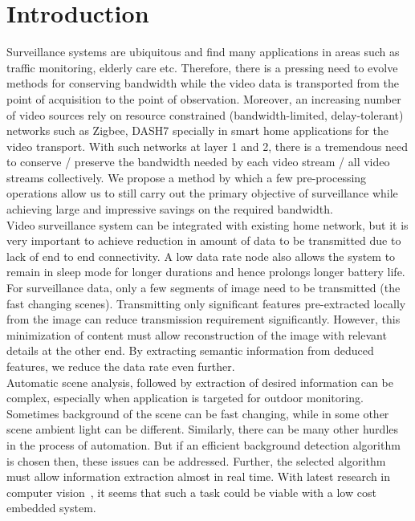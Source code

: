 \documentclass[a4paper, 12pt, twoside]{synopsis}  %
\begin{document}
\section{Introduction}
\indent Surveillance systems are ubiquitous and find many applications
in areas such as traffic monitoring, elderly care etc. Therefore, there
is a pressing need to evolve methods for conserving bandwidth while the
video data is transported from the point of acquisition to the point of
observation. Moreover, an increasing number of video sources rely on
resource constrained (bandwidth-limited, delay-tolerant) networks such
as Zigbee, DASH7 specially in smart home applications for the video
transport. With such networks at layer 1 and 2, there is a tremendous need
to conserve / preserve the bandwidth needed by each video stream / all
video streams collectively. We propose a method by which a few
pre-processing operations allow us to still carry out the primary
objective of surveillance while achieving large and impressive savings
on the required bandwidth.\\
\indent Video surveillance system can be integrated with existing home
network, but it is very important to achieve reduction in amount of
data to be transmitted due to lack of end to end connectivity. A low
data rate node also allows the system to remain in sleep mode for longer
durations and hence prolongs longer battery life.\\
\indent For surveillance data, only a few segments of image need to be
transmitted (the fast changing scenes).  Transmitting only significant
features pre-extracted locally from the image can reduce transmission
requirement significantly. However, this minimization of content must
allow reconstruction of the image with relevant details at the other
end. By extracting semantic information from deduced features, we reduce
the data rate even further. \\
\indent Automatic scene analysis, followed by extraction of desired
information can be complex, especially when application is targeted for
outdoor monitoring.  Sometimes background of the scene can be fast
changing, while in some other scene ambient light can be different.
Similarly, there can be many other hurdles in the process of automation.
But if an efficient background detection algorithm is chosen then, these
issues can be addressed. Further, the selected algorithm must allow
information extraction almost in real time. With latest research in
computer vision~\cite{9, 11}, it seems that such a task could be
viable with a low cost embedded system.\\
\end{document}
